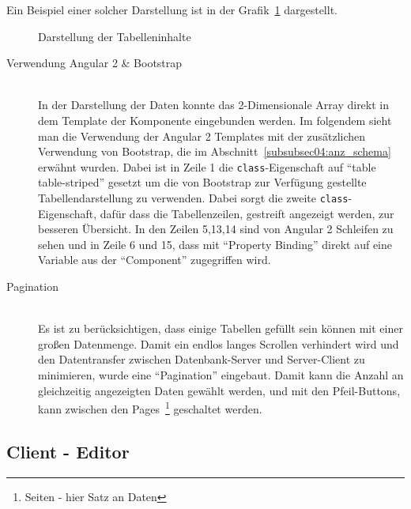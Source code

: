 Ein Beispiel einer solcher Darstellung ist in der Grafik~\ref{pic:table_content} dargestellt.

\begin{figure}[ht]
    \centering
    \caption{Darstellung der Tabelleninhalte}
    \label{pic:table_content}
\end{figure}

\begin{description}
\item[Verwendung Angular 2 \& Bootstrap] \hfill\\
In der Darstellung der Daten konnte das 2-Dimensionale Array direkt in dem Template der Komponente eingebunden werden. Im folgendem sieht man die Verwendung der Angular 2 Templates mit der zusätzlichen Verwendung von Bootstrap, die im Abschnitt~\ref{subsubsec04:anz_schema} erwähnt wurden.
Dabei ist in Zeile 1 die \texttt{class}-Eigenschaft auf ``table table-striped'' gesetzt um die von Bootstrap zur Verfügung gestellte Tabellendarstellung zu verwenden. Dabei sorgt die zweite \texttt{class}-Eigenschaft, dafür dass die Tabellenzeilen, gestreift angezeigt werden, zur besseren Übersicht.
In den Zeilen 5,13,14 sind von Angular 2 Schleifen zu sehen und in Zeile 6 und 15, dass mit ``Property Binding'' direkt auf eine Variable aus der ``Component'' zugegriffen wird.



\item[Pagination] \hfill\\
Es ist zu berücksichtigen, dass einige Tabellen gefüllt sein können mit einer großen Datenmenge. Damit ein endlos langes Scrollen verhindert wird und den Datentransfer zwischen Datenbank-Server und Server-Client zu minimieren, wurde eine ``Pagination'' eingebaut. Damit kann die Anzahl an gleichzeitig angezeigten Daten gewählt werden, und mit den Pfeil-Buttons, kann zwischen den Pages~\footnote{Seiten - hier Satz an Daten} geschaltet werden. 

\end{description}

\newpage

\subsection{Client - Editor}
\label{subsec04:client_edit}

